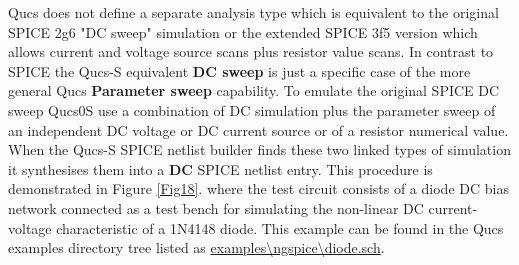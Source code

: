 \documentclass[10pt, a4paper]{report}
\begin{document}
Qucs does not define a separate analysis type which is equivalent to the original SPICE 2g6 "DC sweep" simulation or the extended SPICE 3f5 version which allows current and voltage source scans plus resistor value scans.  In contrast to SPICE the  Qucs-S equivalent \textbf{DC sweep} is just a specific case of the more general Qucs \textbf{Parameter sweep} capability. To emulate the original SPICE DC sweep Qucs0S use a combination of  DC simulation plus the parameter sweep of an independent DC voltage or DC current source or of a resistor numerical value. When the Qucs-S SPICE netlist builder finds these two linked types of simulation it synthesises them into a \textbf{DC} SPICE netlist entry.  This procedure is demonstrated in Figure \ref{Fig18}. where  the test circuit consists of a diode DC bias network connected as a test bench for simulating the non-linear DC current-voltage characteristic of a 1N4148 diode. This example can be found in the Qucs examples directory tree  listed as \url{examples\ngspice\diode.sch}.
\end{document}

